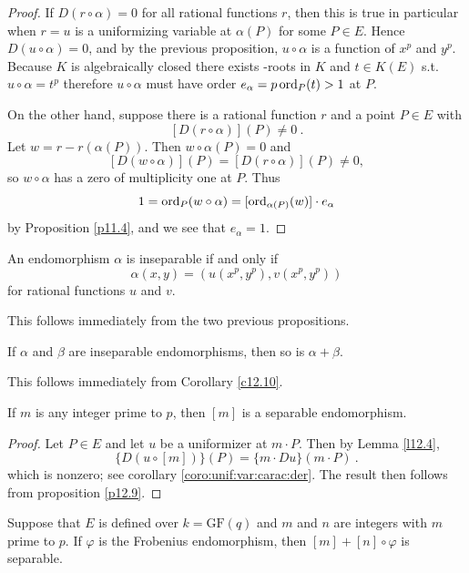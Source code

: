 \begin{proof}
If $D(r\circ\alpha)=0$ for all rational functions $r$, then this is true in particular when $r=u$ is a uniformizing variable at $\alpha(P)$ for some $P\in E$. Hence $D(u\circ\alpha)= 0$, and by the previous proposition, $ u\circ\alpha$ is a function of $x^{p}$ and $y^{p}$. Because $K$ is algebraically closed there exists -roots in $K$ and $t\in K(E)$ s.t. $u\circ\alpha=t^p$ therefore $u\circ\alpha$ must have order $e_{\alpha} = p \operatorname{ord}_{P}(t) > 1$ at $P$.

On the other hand, suppose there is a rational function $r$ and a point $P\in E$ with
$$
[D(r\circ\alpha)](P)\neq 0\ .
$$
Let $w=r-r(\alpha(P))$. Then $w\circ\alpha(P)=0$ and
$$
[D(w\circ\alpha)](P)=[D(r\circ\alpha)](P)\neq 0,
$$
so $ w\circ\alpha$ has a zero of multiplicity one at $P$. Thus
$$
1=\operatorname{ord}_{P}(w\circ\alpha)=[\operatorname{ord}_{\alpha(P)}(w)]\cdot e_{\alpha}
$$
by Proposition \ref{p11.4}, and we see that $e_{\alpha}=1$.
\end{proof}

\begin{coro}
\label{c12.10}
An endomorphism $\alpha$ is inseparable if and only if
$$
\alpha(x, y)=(u(x^{p},y^{p}),v(x^{p},y^{p}))
$$
for rational functions $u$ and $v$.
\end{coro}
This follows immediately from the two previous propositions.

\begin{prop}
\label{l12.12}
If $\alpha$ and $\beta$ are inseparable endomorphisms, then so is $\alpha+\beta$.
\end{prop}

This follows immediately from Corollary \ref{c12.10}.

\begin{coro}
\label{c12.11}
If $m$ is any integer prime to $p$, then $[m]$ is a separable endomorphism.
\end{coro}

\begin{proof}
Let $P\in E$ and let $u$ be a uniformizer at $m\cdot P$. Then by Lemma \ref{l12.4},
$$
\{D(u\circ[m])\}(P)=\{m\cdot Du\}(m\cdot P)\ .
$$
which is nonzero; see corollary \ref{coro:unif:var:carac:der}. The result then follows from proposition \ref{p12.9}.
\end{proof}


\begin{prop}
\label{p12.13}
Suppose that $E$ is defined over $k=\textrm{GF}(q)$ and $m$ and $n$ are integers with $m$ prime to $p$. If $\varphi$ is the Frobenius endomorphism, then $[m]+[n]\circ\varphi$ is separable.
\end{prop}

